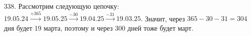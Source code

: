 338. Рассмотрим следующую цепочку: $19.05.24\stackrel{+365}{\rightarrow}19.05.25\stackrel{-30}{\rightarrow}19.04.25
\stackrel{-31}{\rightarrow}19.03.25.$ Значит, через $365-30-31=304$ дня будет 19 марта, поэтому и через 300 дней тоже будет март.\\
